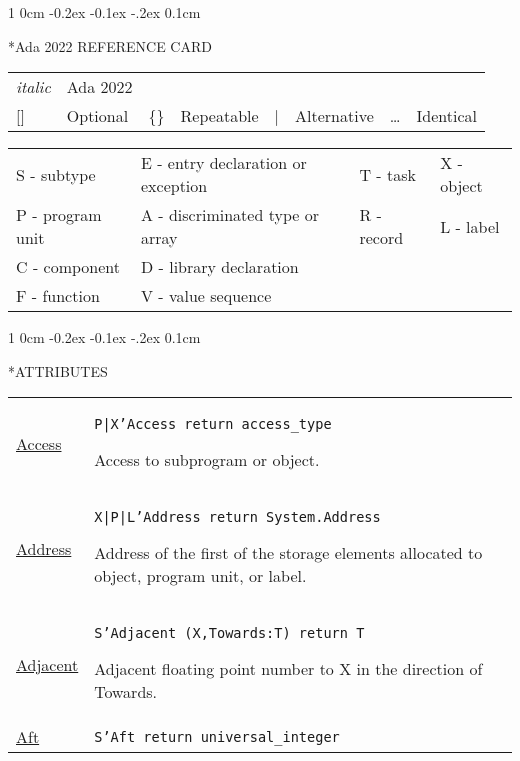 \documentclass[english]{article}
\makeatletter
\renewcommand\section{%
   \@startsection{section}%
   {1}%
   {0cm}%
   {-0.2ex \@plus -0.1ex \@minus -.2ex}%
   {0.1cm}%
{\raggedright\normalfont\normalsize\bfseries}%
}
\makeatother
\begin{document}
\begin{scriptsize}
\begin{multicols*}{3}
\section*{Ada 2022 REFERENCE CARD}
\begin{tabular}{@{}l l l l l l l l}
\textit{italic} & Ada 2022 &&&&&&\\
{[]} & Optional & \{\} & Repeatable & | & Alternative & \dots & Identical\\
\end{tabular}
\newline
\smallskip
\newline
\begin{tabular}{@{}l l l l}
   S - subtype & E - entry declaration or exception & T - task & X - object\\
   P - program unit & A - discriminated type or array & R - record & L - label\\
   C - component & D - library declaration &&\\
   F - function & V - value sequence &&\\
\end{tabular}
\section*{ATTRIBUTES}
\RaggedRight
\renewcommand{\arraystretch}{1.5}
\begin{tabular}{@{}p{2cm}p{6.5cm}}

   \href{http://www.ada-auth.org/standards/22rm/html/RM-K-2.html}{Access} & \texttt{P|X'Access return access\_type}

   Access to subprogram or object.\\

   \href{http://www.ada-auth.org/standards/22rm/html/RM-K-2.html}{Address} & \texttt{X|P|L'Address return System.Address}

   Address of the first of the storage elements allocated to object, program unit, or label.\\

   \href{http://www.ada-auth.org/standards/22rm/html/RM-K-2.html}{Adjacent} & \texttt{S'Adjacent (X,Towards:T) return T}

   Adjacent floating point number to X in the direction of Towards.\\

   \href{http://www.ada-auth.org/standards/22rm/html/RM-K-2.html}{Aft} & \texttt{S'Aft return universal\_integer}


\end{tabular}
\end{multicols*}
\end{scriptsize}
\end{document}
